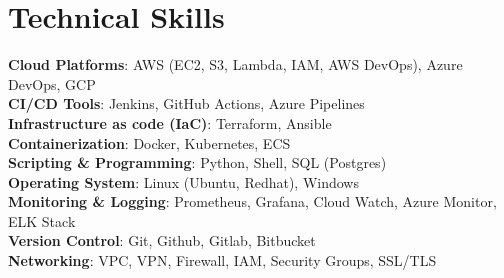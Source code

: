 \documentclass[letterpaper,11pt]{article}
\begin{document}
\section{Technical Skills}
 \begin{itemize}[leftmargin=0.15in, label={}]
    \small{\item{
     \textbf{Cloud Platforms}{: AWS (EC2, S3, Lambda, IAM, AWS DevOps), Azure DevOps, GCP} \\
     \textbf{CI/CD Tools}{: Jenkins, GitHub Actions, Azure Pipelines} \\
     \textbf{Infrastructure as code (IaC)}{: Terraform, Ansible} \\
     \textbf{{Containerization}}{: Docker, Kubernetes, ECS} \\
     \textbf{Scripting \& Programming}{: Python, Shell, SQL (Postgres)} \\
     \textbf{Operating System}{: Linux (Ubuntu, Redhat), Windows} \\
     \textbf{Monitoring \& Logging}{: Prometheus, Grafana, Cloud Watch, Azure Monitor, ELK Stack} \\
     \textbf{Version Control}{: Git, Github, Gitlab, Bitbucket} \\
     \textbf{{Networking}}{: VPC, VPN, Firewall, IAM, Security Groups, SSL/TLS} \\
    }}
 \end{itemize}


\end{document}
